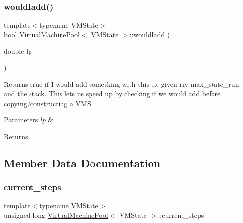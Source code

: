 \subsubsection{\texorpdfstring{would\+Iadd()}{wouldIadd()}}
{\footnotesize\ttfamily template$<$typename V\+M\+State$>$ \\
bool \hyperlink{class_virtual_machine_pool}{Virtual\+Machine\+Pool}$<$ V\+M\+State $>$\+::would\+Iadd (\begin{DoxyParamCaption}\item[{double}]{lp }\end{DoxyParamCaption})\hspace{0.3cm}{\ttfamily [inline]}}

Returns true if I would add something with this lp, given my max\+\_\+state\+\_\+run and the stack. This lets us speed up by checking if we would add before copying/constructing a V\+MS 
\begin{DoxyParams}{Parameters}
{\em lp} & \\
\hline
\end{DoxyParams}
\begin{DoxyReturn}{Returns}

\end{DoxyReturn}


\subsection{Member Data Documentation}
\mbox{\label{class_virtual_machine_pool_a63db532386cd929a09525f7ab569ff81}} 
\subsubsection{\texorpdfstring{current\+\_\+steps}{current\_steps}}
{\footnotesize\ttfamily template$<$typename V\+M\+State$>$ \\
unsigned long \hyperlink{class_virtual_machine_pool}{Virtual\+Machine\+Pool}$<$ V\+M\+State $>$\+::current\+\_\+steps}

\mbox{\label{class_virtual_machine_pool_a042d1b151817c99638f8b35303eb508f}} 
